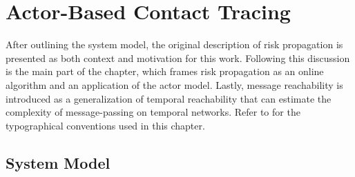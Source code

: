 \chapter{Actor-Based Contact Tracing}

After outlining the system model, the original description of risk propagation is presented as both context and motivation for this work. Following this discussion is the main part of the chapter, which frames risk propagation as an online algorithm and an application of the actor model. Lastly, message reachability is introduced as a generalization of temporal reachability that can estimate the complexity of message-passing on temporal networks. Refer to  for the typographical conventions used in this chapter.

\section{System Model}

